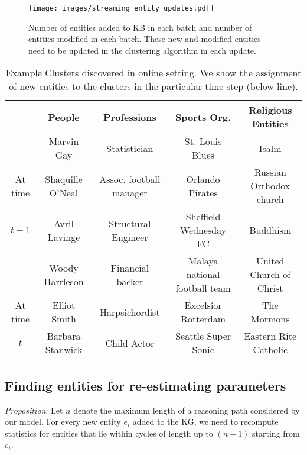 \documentclass[11pt,a4paper]{article}
\begin{document}
\begin{figure}
    \centering
    \texttt{[image: images/streaming\_entity\_updates.pdf]}
    \caption{Number of entities added to KB in each batch and number of entities modified in each batch. These new and modified entities need to be updated in the clustering algorithm in each update.}
    \label{fig:streaming_up}
\end{figure}

\begin{table*}
\footnotesize
    \centering
    \begin{tabular}{c c c c c }
         \toprule
         &\bf People & \bf Professions & \bf Sports Org. & \bf Religious Entities  \\
         \midrule
         & Marvin Gay & Statistician & St. Louis Blues & Isalm \\
         At time &Shaquille O’Neal & Assoc. football manager  & Orlando Pirates  & Russian Orthodox church \\
         $t-1$ &Avril Lavinge & Structural Engineer & Sheffield Wednesday FC & Buddhism\\
         &Woody Harrleson & Financial backer & Malaya national football team & United Church of Christ \\
         \midrule
         \midrule
       At time & Elliot Smith & Harpsichordist &  Excelsior Rotterdam &  The Mormons  \\
        $t$ & Barbara Stanwick  & Child Actor &  Seattle Super Sonic &  Eastern Rite Catholic\\
         \bottomrule
    \end{tabular}
    \caption{Example Clusters discovered in online setting. We show the assignment of new entities to the clusters in the particular time step (below line).}
    \label{tab:appendix_cluster_eye_candy}
\end{table*} 

\subsection{Finding entities for re-estimating parameters}
\label{sub:appendix_estimate_params}
\textit{Proposition}: Let $n$ denote the maximum length of a reasoning path considered by our model. For every new entity $e_i$ added to the KG, we need to recompute statistics for entities that lie within cycles of length up to $(n+1)$ starting from $e_i$.
\end{document}
